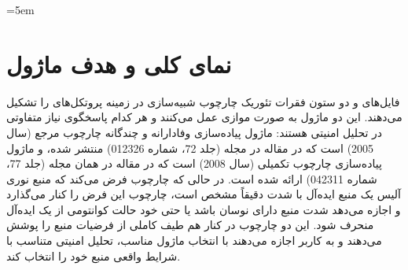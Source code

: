 \sloppy
\emergencystretch=5em

\section{نمای‌ کلی و هدف ماژول}

فایل‌های  و  دو ستون فقرات تئوریک چارچوب شبیه‌سازی  در زمینه پروتکل‌های  را تشکیل می‌دهند. این دو ماژول به صورت موازی عمل می‌کنند و هر کدام پاسخگوی نیاز متفاوتی در تحلیل امنیتی هستند: ماژول  پیاده‌سازی وفادارانه و چندگانه چارچوب مرجع  (سال 2005) است که در مقاله  در مجله  (جلد 72، شماره 012326) منتشر شده، و ماژول  پیاده‌سازی چارچوب تکمیلی  (سال 2008) است که در مقاله  در همان مجله (جلد 77، شماره 042311) ارائه شده است. در حالی که چارچوب  فرض می‌کند که منبع نوری آلیس یک منبع  ایده‌آل با شدت دقیقاً مشخص است، چارچوب  این فرض را کنار می‌گذارد و اجازه می‌دهد شدت منبع دارای نوسان باشد یا حتی خود حالت کوانتومی از یک  ایده‌آل منحرف شود. این دو چارچوب در کنار هم طیف کاملی از فرضیات منبع را پوشش می‌دهند و به کاربر اجازه می‌دهند با انتخاب ماژول مناسب، تحلیل امنیتی متناسب با شرایط واقعی منبع خود را انتخاب کند.

